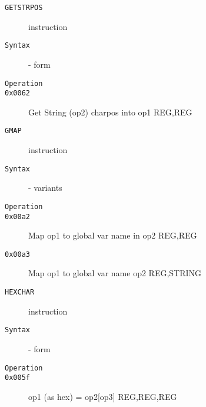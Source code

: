 \clearpage
\begin{description}
\item[\texttt{GETSTRPOS}] instruction\\
\item[\texttt{Syntax}] - form \\

\item[\texttt{Operation}]
\item[\texttt{}]
\item[\texttt{0x0062}] Get String (op2) charpos into op1  {REG,REG}           \\
\end{description}
\clearpage
\begin{description}
\item[\texttt{GMAP}] instruction\\
\item[\texttt{Syntax}] - variants\\

\item[\texttt{Operation}]
\item[\texttt{}]
\item[\texttt{0x00a2}] Map op1 to global var name in op2  {REG,REG}           \\
\item[\texttt{0x00a3}] Map op1 to global var name op2  {REG,STRING}        \\
\end{description}
\clearpage
\begin{description}
\item[\texttt{HEXCHAR}] instruction\\
\item[\texttt{Syntax}] - form \\

\item[\texttt{Operation}]
\item[\texttt{}]
\item[\texttt{0x005f}] op1 (as hex) = op2[op3]  {REG,REG,REG}       \\
\end{description}
